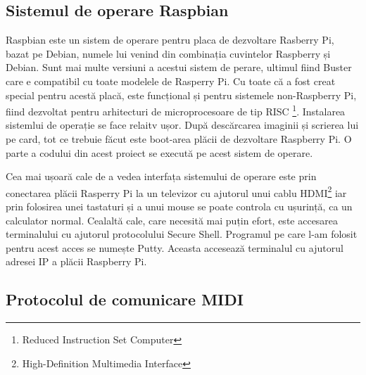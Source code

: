 \documentclass[../IoMusT.tex]{subfiles}
\begin{document}
\subsection{Sistemul de operare Raspbian}
Raspbian este un sistem de operare pentru placa de dezvoltare Rasberry Pi, bazat pe Debian, numele lui venind din combinația cuvintelor Raspberry și Debian. Sunt mai multe versiuni a acestui sistem de perare, ultimul fiind Buster care e compatibil cu toate modelele de Rasperry Pi. Cu toate că a fost creat special pentru acestă placă, este funcțional și pentru sistemele non-Raspberry Pi, fiind dezvoltat pentru arhitecturi de microprocesoare de tip RISC \footnote{Reduced Instruction Set Computer}. Instalarea sistemlui de operație se face relaitv ușor. După descărcarea imaginii și scrierea lui pe card, tot ce trebuie făcut este boot-area plăcii de dezvoltare Raspberry Pi. O parte a codului din acest proiect se execută pe acest sistem de operare.
\\
\par Cea mai ușoară cale de a vedea interfața sistemului de operare este prin conectarea plăcii Rasperry Pi la un televizor cu ajutorul unui cablu HDMI\footnote{High-Definition Multimedia Interface} iar prin folosirea unei tastaturi și a unui mouse se poate controla cu ușurință, ca un calculator normal. Cealaltă cale, care necesită mai puțin efort, este accesarea terminalului cu ajutorul protocolului Secure Shell. Programul pe care l-am folosit pentru acest acces se numește Putty. Aceasta accesează terminalul cu ajutorul adresei IP a plăcii Raspberry Pi.
\\
\subsection{Protocolul de comunicare MIDI}
\end{document}
